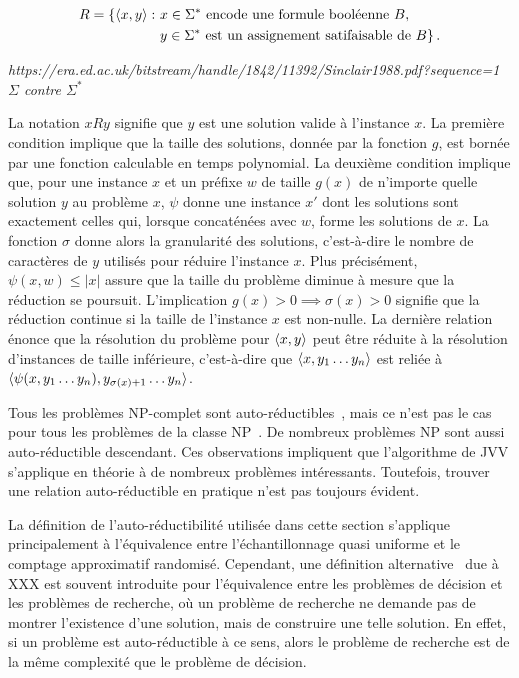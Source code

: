 \begin{equation}
    \begin{aligned}
    R = \{ \braket{x, y} : \ & x \in \Sigma^{*} \text{ encode une formule booléenne } B, \\ 
    & y \in \Sigma^{*} \text{ est un assignement satifaisable de } B \} \,.
    \end{aligned}
\end{equation}

\textcolor{mydarkred}{\textit{https://era.ed.ac.uk/bitstream/handle/1842/11392/Sinclair1988.pdf?sequence=1}}
\textcolor{mydarkred}{\textit{$\Sigma$ contre $\Sigma^{*}$}}

La notation $xRy$ signifie que $y$ est une solution valide à l'instance $x$. La première condition implique que la taille des solutions, donnée par la fonction $g$, est bornée par une fonction calculable en temps polynomial. La deuxième condition implique que, pour une instance $x$ et un préfixe $w$ de taille $g(x)$ de n'importe quelle solution $y$ au problème $x$, $\psi$ donne une instance $x'$ dont les solutions sont exactement celles qui, lorsque concaténées avec $w$, forme les solutions de $x$. La fonction $\sigma$ donne alors la granularité des solutions, c'est-à-dire le nombre de caractères de $y$ utilisés pour réduire l'instance $x$. Plus précisément, $\psi(x, w) \leq \lvert x \rvert$ assure que la taille du problème diminue à mesure que la réduction se poursuit. L'implication $g(x) > 0 \implies  \sigma(x) > 0$ signifie que la réduction continue si la taille de l'instance $x$ est non-nulle. La dernière relation énonce que la résolution du problème pour $\braket{x, y}$ peut être réduite à la résolution d'instances de taille inférieure, c'est-à-dire que $\braket{x, y_{1}\dots y_{n}}$ est reliée à $\braket{\psi(x, y_{1}\dots y_{n}), y_{\sigma(x)+1}\dots y_{n}}$.

Tous les problèmes \textsf{NP}-complet sont auto-réductibles~\cite{goldreichComputationalComplexityConceptual2008a}, mais ce n'est pas le cas pour tous les problèmes de la classe \textsf{NP}~\cite{khullerPlanarGraphColoring1991a}. De nombreux problèmes \textsf{NP} sont aussi auto-réductible descendant. Ces observations impliquent que l'algorithme de JVV s'applique en théorie à de nombreux problèmes intéressants. Toutefois, trouver une relation auto-réductible en pratique n'est pas toujours évident.

La définition de l'auto-réductibilité utilisée dans cette section s'applique principalement à l'équivalence entre l'échantillonnage quasi uniforme et le comptage approximatif randomisé. Cependant, une définition alternative~\cite{goldreichComputationalComplexityConceptual2008a} due à XXX est souvent introduite pour l'équivalence entre les problèmes de décision et les problèmes de recherche, où un problème de recherche ne demande pas de montrer l'existence d'une solution, mais de construire une telle solution. En effet, si un problème est auto-réductible à ce sens, alors le problème de recherche est de la même complexité que le problème de décision. 

